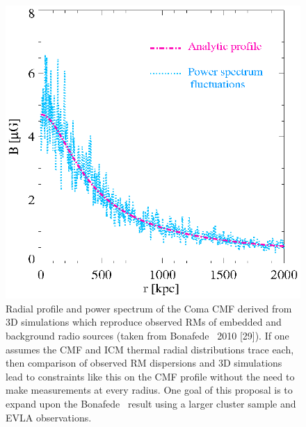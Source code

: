 \begin{figure}
  \begin{center}
    \begin{minipage}{\linewidth}
      \includegraphics*[width=\linewidth, trim=0mm 0mm 0mm 0mm, clip]{bonafede.ps}
    \end{minipage}
    \caption{Radial profile and power spectrum of the Coma CMF derived
      from 3D simulations which reproduce observed RMs of embedded and
      background radio sources (taken from Bonafede \etal\ 2010
      [29]). If one assumes the CMF and ICM thermal radial
      distributions trace each, then comparison of observed RM
      dispersions and 3D simulations lead to constraints like this on
      the CMF profile without the need to make measurements at every
      radius. One goal of this proposal is to expand upon the Bonafede
      \etal\ result using a larger cluster sample and EVLA
      observations.}
  \end{center}
\end{figure}

